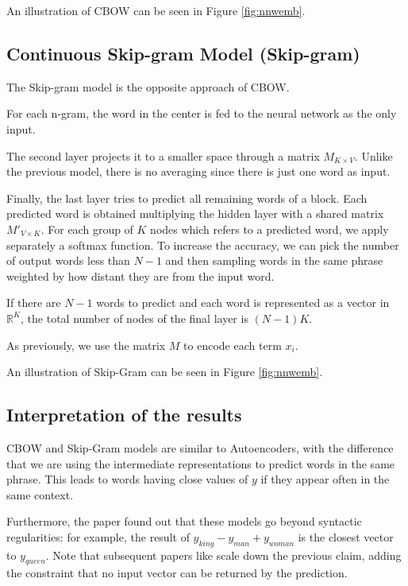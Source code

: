 An illustration of CBOW can be seen in Figure \ref{fig:nnwemb}.

\subsection{Continuous Skip-gram Model (Skip-gram)}
The Skip-gram model is the opposite approach of CBOW.

For each n-gram, the word in the center is fed to the neural network as the only input.

The second layer projects it to a smaller space through a matrix $M_{K \times V}$.
Unlike the previous model, there is no averaging since there is just one word as input.

Finally, the last layer tries to predict all remaining words of a block.
Each predicted word is obtained multiplying the hidden layer with a shared matrix $M'_{V \times K}$.
For each group of $K$ nodes which refers to a predicted word, we apply separately a softmax function.
To increase the accuracy, we can pick the number of output words less than $N-1$ and then sampling
words in the same phrase weighted by how distant they are from the input word.

If there are $N-1$ words to predict and each word is represented as a vector in $\mathbb{R}^K$,
the total number of nodes of the final layer is $(N-1)K$.

As previously, we use the matrix $M$ to encode each term $x_i$.

An illustration of Skip-Gram can be seen in Figure \ref{fig:nnwemb}.

\subsection{Interpretation of the results}
CBOW and Skip-Gram models are similar to Autoencoders,
with the difference that we are using the intermediate representations to predict words in the same phrase.
This leads to words having close values of $y$ if they appear often in the same context.

Furthermore, the paper \cite{DBLP:journals/corr/abs-1301-3781}
found out that these models go beyond syntactic regularities: for example,
the result of $y_{king} - y_{man} + y_{woman}$ is the closest vector to $y_{queen}$.
Note that subsequent papers like \cite{DBLP:journals/corr/abs-1905-09866} scale down the previous claim,
adding the constraint that no input vector can be returned by the prediction.

